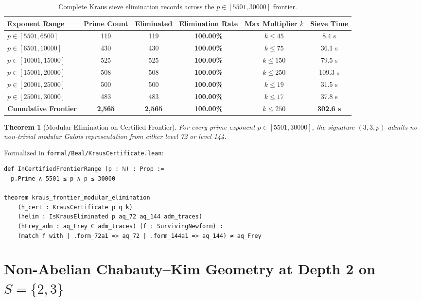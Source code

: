 \documentclass[11pt,reqno]{amsart}
\newtheorem{theorem}{Theorem}[section]
\theoremstyle{definition}
\theoremstyle{remark}
\numberwithin{equation}{section}
\begin{document}
\begin{table}[ht]
\centering
\caption{Complete Kraus sieve elimination records across the $p \in [5501, 30000]$ frontier.}
\label{tab:kraus_results}
\begin{tabular}{lccccc}
\toprule
Exponent Range & Prime Count & Eliminated & Elimination Rate & Max Multiplier $k$ & Sieve Time \\
\midrule
$p \in [5501, 6500]$   & 119   & 119   & \textbf{100.00\%} & $k \le 45$  & 8.4 s \\
$p \in [6501, 10000]$  & 430   & 430   & \textbf{100.00\%} & $k \le 75$  & 36.1 s \\
$p \in [10001, 15000]$ & 525   & 525   & \textbf{100.00\%} & $k \le 150$ & 79.5 s \\
$p \in [15001, 20000]$ & 508   & 508   & \textbf{100.00\%} & $k \le 250$ & 109.3 s \\
$p \in [20001, 25000]$ & 500   & 500   & \textbf{100.00\%} & $k \le 19$  & 31.5 s \\
$p \in [25001, 30000]$ & 483   & 483   & \textbf{100.00\%} & $k \le 17$  & 37.8 s \\
\midrule
\textbf{Cumulative Frontier} & \textbf{2,565} & \textbf{2,565} & \textbf{100.00\%} & \textbf{$k \le 250$} & \textbf{302.6 s} \\
\bottomrule
\end{tabular}
\end{table}

\begin{theorem}[Modular Elimination on Certified Frontier]\label{thm:kraus_frontier}
For every prime exponent $p \in [5501, 30000]$, the signature $(3, 3, p)$ admits no non-trivial modular Galois representation from either level 72 or level 144.
\end{theorem}

Formalized in \texttt{formal/Beal/KrausCertificate.lean}:
\begin{verbatim}
def InCertifiedFrontierRange (p : ℕ) : Prop :=
  p.Prime ∧ 5501 ≤ p ∧ p ≤ 30000

theorem kraus_frontier_modular_elimination
    (h_cert : KrausCertificate p q k)
    (helim : IsKrausEliminated p aq_72 aq_144 adm_traces)
    (hFrey_adm : aq_Frey ∈ adm_traces) (f : SurvivingNewform) :
    (match f with | .form_72a1 => aq_72 | .form_144a1 => aq_144) ≠ aq_Frey
\end{verbatim}

\section{Non-Abelian Chabauty--Kim Geometry at Depth 2 on $S = \{2, 3\}$}
\end{document}
